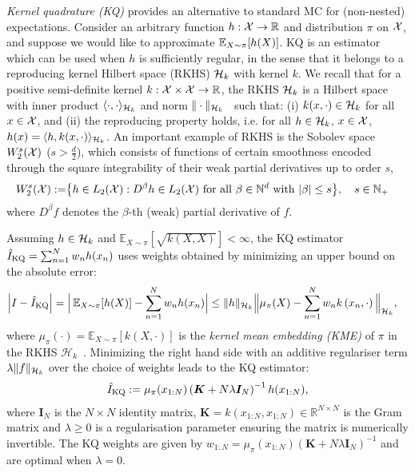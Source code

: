 \emph{Kernel quadrature (KQ)} \citep{sommariva2006numerical,Rasmussen2003,Briol2019PI} provides an alternative to standard MC for (non-nested) expectations. Consider an arbitrary function $h:\mathcal{X} \rightarrow \mathbb{R}$ and distribution $\pi$ on $\mathcal{X}$, and suppose we would like to approximate $\operatorname{\mathbb{E}}_{X \sim \pi}[h(X)]$. KQ is an estimator which can be used when $h$ is sufficiently regular, in the sense that it belongs to a reproducing kernel Hilbert space (RKHS) \cite{Berlinet2004} $\mathcal{H}_k$ with kernel $k$. We recall that for a positive semi-definite kernel $k : \mathcal{X} \times \mathcal{X} \to \mathbb{R}$, the RKHS $\mathcal{H}_k$ is a Hilbert space with inner product $\langle \cdot,\cdot \rangle_{\mathcal{H}_k}$ and norm $\Vert \cdot \Vert_{\mathcal{H}_k}$~\citep{aronszajn1950theory} such that: (i) $k(x,\cdot) \in \mathcal{H}_k$ for all $x \in \mathcal{X}$, and (ii) the reproducing property holds, i.e. for all $h \in \mathcal{H}_k$, $x\in \mathcal{X}$,  $h(x)=\langle h,k(x,\cdot) \rangle_{\mathcal{H}_k}$. An important example of  RKHS is the Sobolev space $W_2^s(\mathcal{X})$ ($s > \frac{d}{2}$), which consists of functions of certain smoothness encoded through the square integrability of their weak partial derivatives up to order $s$, 
\begin{align}\label{eq:defi_sobolev}
    W_2^s(\mathcal{X}) := &\big \{h \in L_2(\mathcal{X}): D^\beta h \in L_2(\mathcal{X}) \text { for all } \beta \in \mathbb{N}^d \text { with }|\beta| \leq s \big \}, \quad s \in \mathbb{N}_+
\end{align}
where $D^\beta f$ denotes the $\beta$-th (weak) partial derivative of $f$. 

Assuming $h \in \mathcal{H}_k$ and $\mathbb{E}_{X \sim \pi}[\sqrt{k(X, X)}] < \infty$, 
the KQ estimator $\hat{I}_{\text{KQ}} = \sum_{n=1}^N w_n h(x_n)$ uses weights obtained by minimizing an upper bound on the absolute error:
\begin{align*}
    \left|I- \hat{I}_{\text{KQ}} \right| &= \Big| \operatorname{\mathbb{E}}_{X \sim \pi}[h(X)] - \sum_{n=1}^N w_n h(x_n) \Big| \leq \|h\|_{\mathcal{H}_k} \Big\| \mu_\pi(X) - \sum_{n=1}^N w_n k\left(x_n,\cdot \right)  \Big\|_{\mathcal{H}_k},
\end{align*}
where $\mu_\pi(\cdot) = \mathbb{E}_{X \sim \pi}[k(X,\cdot)]$ is the \emph{kernel mean embedding (KME)} of $\pi$ in the RKHS $\mathcal{H}_k$~\citep{smola2007hilbert}.
Minimizing the right hand side with an additive regulariser term $\lambda \|f\|_{\mathcal{H}_k}$ over the choice of weights leads to the KQ estimator:
\begin{align}\label{eq:kq}
     \hat{I}_{\text{KQ}} := \mu_\pi(x_{1:N}) \left( \boldsymbol{K} + N \lambda \boldsymbol{I}_N \right)^{-1}h(x_{1:N}),
\end{align}
where $\boldsymbol{I}_N$ is the $N \times N$ identity matrix, $\boldsymbol{K} = k(x_{1:N}, x_{1:N}) \in \mathbb{R}^{N \times N}$ is the Gram matrix and $\lambda \geq 0 $ is a regularisation parameter ensuring the matrix is numerically invertible. 
The KQ weights are given by $w_{1:N} = \mu_\pi(x_{1:N}) ( \boldsymbol{K} + N \lambda \boldsymbol{I}_N )^{-1}$ and are optimal when $\lambda=0$. 


